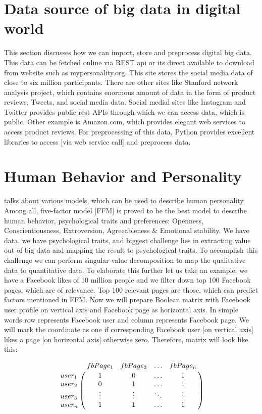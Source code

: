 \documentclass[sigconf]{acmart}
\begin{document}
 
 \section{Data source of big data in digital world}
 
 This section discusses how we can import, store and preprocess digital big data. This data can be fetched online via REST api or its direct available to download from website such as mypersonality.org. This site stores the social media data of close to six million participants. There are other sites like Stanford network analysis project, which contains enormous amount of data in the form of product reviews, Tweets, and social media data. Social medial sites like Instagram and Twitter provides public rest APIs through which we can access data, which is public. Other example is Amazon.com, which provides elegant web services to access product reviews. For preprocessing of this data, Python provides excellent libraries to access [via web service call] and preprocess data. 
 
 \section{Human Behavior and Personality }
\cite{ref11} talks about various models, which can be used to describe human personality. Among all, five-factor model [FFM] is proved to be the best model to describe human behavior, psychological traits and preferences: Openness, Conscientiousness, Extroversion, Agreeableness & Emotional stability. We have data, we have psychological traits, and biggest challenge lies in extracting value out of big data and mapping the result to psychological traits. To accomplish this challenge we can perform singular value decomposition to map the qualitative data to quantitative data. To elaborate this further let us take an example: we have a Facebook likes of 10 million people and we filter down top 100 Facebook pages, which are of relevance. Top 100 relevant pages are those, which can predict factors mentioned in FFM. Now we will prepare Boolean matrix with Facebook user profile on vertical axis and Facebook page as horizontal axis. In simple words row represents Facebook user and column represents Facebook page. We will mark the coordinate as one if corresponding Facebook user [on vertical axis] likes a page [on horizontal axis] otherwise zero. Therefore, matrix will look like this:

$$\bordermatrix{\text{}&fbPage_1 &fbPage_2&\ldots &fbPage_n\cr
                user_1&1 &  0  & \ldots & 1\cr
                user_2& 0  &  1 & \ldots & 1\cr
                user_3& \vdots & \vdots & \ddots & \vdots\cr
                user_n& 1  &   1       &\ldots & 1}$$
\end{document}
